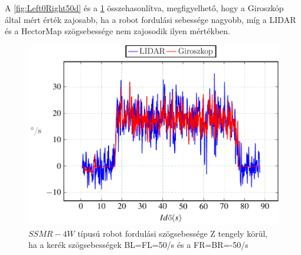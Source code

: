 A \ref{fig:Left0Right50d} és a \ref{fig:Left_n50Right50d} összehasonlítva, megfigyelhető, hogy a Giroszkóp által mért érték zajosabb, ha a robot fordulási sebessége nagyobb, míg a LIDAR és a HectorMap szögsebessége nem zajosodik ilyen mértékben.

\begin{figure}[H]
  \includegraphics{tikz/Left_n50Right50d.pdf}
  \caption{$SSMR-4W$ típusú robot fordulási szögsebessége Z tengely körül, ha a kerék szögsebességek BL=FL=50\degree/s és a FR=BR=-50\degree/s}
    \label{fig:Left_n50Right50d}
\end{figure}

